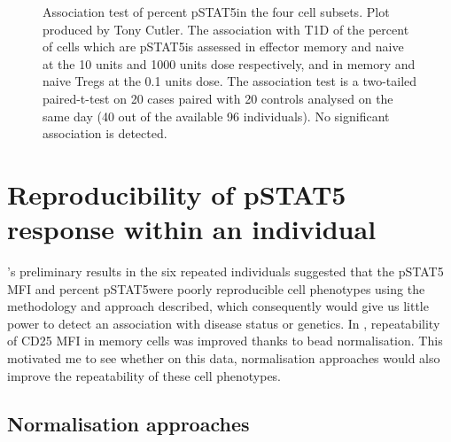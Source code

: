 \begin{figure}
\begin{minipage}{.65\textwidth}
\end{minipage}
\begin{minipage}{\textwidth}
{ Association test of percent pSTAT5\positive in the four cell subsets. }
{
  Plot produced by Tony Cutler.
  The association with T1D of the percent of cells which are pSTAT5\positive is assessed in effector memory and naive at the 10 units and 1000 units dose
  respectively, and in memory and naive Tregs at the 0.1 units dose.
  The association test is a two-tailed paired-t-test on 20 cases paired with 20 controls analysed on the same day (40 out of the available 96 individuals).
  No significant association is detected.
}
\end{minipage}
\end{figure}

\section{Reproducibility of pSTAT5 response within an individual}

's preliminary results in the six repeated individuals suggested that the pSTAT5 MFI and percent pSTAT5\positive were poorly reproducible
cell phenotypes using the methodology and approach described, which consequently would give us little power to detect an association with disease status or genetics.
In , repeatability of CD25 MFI in memory cells was improved thanks to bead normalisation.
This motivated me to see whether on this data, normalisation approaches would also improve the repeatability of these cell phenotypes.

\subsection{Normalisation approaches}

